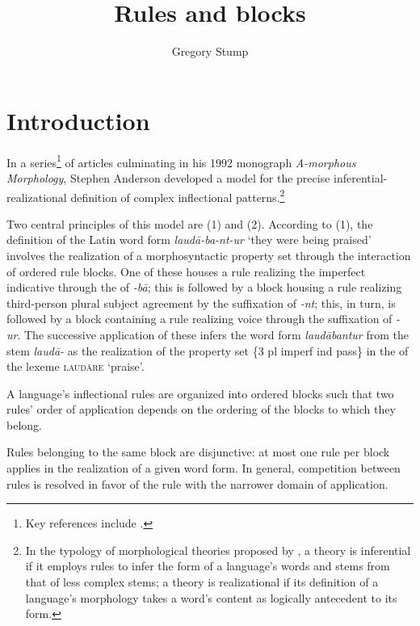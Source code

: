 \documentclass[output=paper,
modfonts
]{LSP/langsci}
\title{Rules and blocks}
\author{%
Gregory Stump\affiliation{University of Kentucky}
}
\begin{document}
\maketitle

\section{Introduction}

In a series\footnote{Key references include \citealt{Anderson1977a,Anderson1982,Anderson1984,Anderson1984b,Anderson1986}.} of articles culminating in his 1992 monograph \textit{A\nobreakdash-morphous Morphology}, Stephen Anderson developed a model for the precise inferential-realizational definition of complex inflectional patterns.\footnote{In the typology of morphological theories proposed by \citet{Stump2001}, a theory is inferential if it employs rules to infer the form of a language’s words and stems from that of less complex stems; a theory is realizational if its definition of a language’s morphology takes a word’s content as logically antecedent to its form.}

Two central principles of this model are (1) and (2).  According to (1), the definition of the Latin word form \textit{laud\=a-ba-nt-ur} ‘they were being praised’ involves the realization of a morphosyntactic property set through the interaction of ordered rule blocks.  One of these houses a rule realizing the imperfect indicative through the  of \textit{{}-b\=a}; this is followed by a block housing a rule realizing third-person plural subject agreement by the suffixation of \textit{{}-nt}; this, in turn, is followed by a block containing a rule realizing  voice through the suffixation of \textit{-ur}.  The successive application of these  infers the word form \textit{laud\=abantur} from the stem \textit{laud\=a-} as the realization of the property set \{3 pl imperf ind pass\} in the  of the lexeme \textsc{laud\=are} ‘praise’.

\ea%
	   A language’s inflectional rules are organized into ordered blocks such that two rules’ order of application depends on the ordering of the blocks to which they belong.
\z

\ea%
Rules belonging to the same block are disjunctive:  at most one rule per block applies in the realization of a given word form.  In general, competition between rules is resolved in favor of the rule with the narrower domain of application. 
    \z
\end{document}
